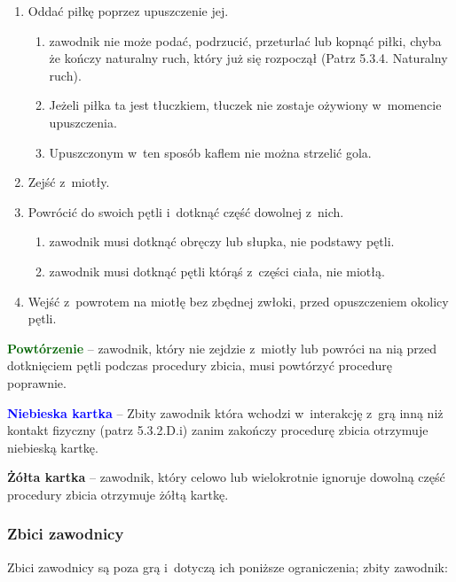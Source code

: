 \documentclass[12pt]{article}
\newcommand\yellowcard[1]{\bgroup\textcolor{darkyellow}{\textbf{#1}}}
\newcommand\bluecard[1]{\bgroup\textcolor{blue}{\textbf{#1}}}
\newcommand\other[1]{\bgroup\textcolor{darkgreen}{\textbf{#1}}}
\begin{document}
\begin{enumerate}
	\item
	      Oddać piłkę poprzez upuszczenie jej.

	      \begin{enumerate}
		      \item
		            zawodnik nie może podać, podrzucić, przeturlać lub kopnąć piłki,
		            chyba że kończy naturalny ruch, który już się rozpoczął (Patrz
		            5.3.4. Naturalny ruch).
		      \item
		            Jeżeli piłka ta jest tłuczkiem, tłuczek nie zostaje ożywiony w~momencie upuszczenia.
		      \item
		            Upuszczonym w~ten sposób kaflem nie można strzelić gola.
	      \end{enumerate}
	\item
	      Zejść z~miotły.
	\item
	      Powrócić do swoich pętli i~dotknąć część dowolnej z~nich.

	      \begin{enumerate}
		      \item
		            zawodnik musi dotknąć obręczy lub słupka, nie podstawy pętli.
		      \item
		            zawodnik musi dotknąć pętli którąś z~części ciała, nie miotłą.
	      \end{enumerate}
	\item Wejść z~powrotem na miotłę bez zbędnej zwłoki, przed opuszczeniem
	      okolicy pętli.

\end{enumerate}

\other{Powtórzenie} -- zawodnik, który nie zejdzie z~miotły lub powróci
na nią przed dotknięciem pętli podczas procedury zbicia, musi powtórzyć
procedurę poprawnie.

\bluecard{Niebieska kartka} -- Zbity zawodnik która wchodzi w~interakcję z~grą inną niż kontakt fizyczny (patrz 5.3.2.D.i) zanim zakończy procedurę
zbicia otrzymuje niebieską kartkę.

\yellowcard{Żółta kartka} -- zawodnik, który celowo lub wielokrotnie ignoruje
dowolną część procedury zbicia otrzymuje żółtą kartkę.

\subsubsection{Zbici zawodnicy}

Zbici zawodnicy są poza grą i~dotyczą ich poniższe ograniczenia; zbity
zawodnik:
\end{document}
